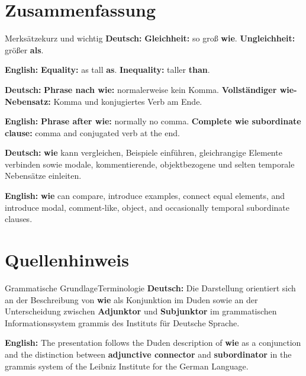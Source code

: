\documentclass[a4paper,11pt]{article}
\newcommand{\GermanText}[1]{\textbf{Deutsch: }#1\par}
\newcommand{\EnglishText}[1]{{\small\color{SoftGray}\textbf{English: }#1\par}}
\begin{document}
\section{Zusammenfassung}

\begin{grammarentry}{Merksätze}{kurz und wichtig}
\GermanText{\textbf{Gleichheit:} so groß \textbf{wie}. \textbf{Ungleichheit:} größer \textbf{als}.}
\EnglishText{\textbf{Equality:} as tall \textbf{as}. \textbf{Inequality:} taller \textbf{than}.}

\GermanText{\textbf{Phrase nach wie:} normalerweise kein Komma. \textbf{Vollständiger wie-Nebensatz:} Komma und konjugiertes Verb am Ende.}
\EnglishText{\textbf{Phrase after wie:} normally no comma. \textbf{Complete wie subordinate clause:} comma and conjugated verb at the end.}

\GermanText{\textbf{wie} kann vergleichen, Beispiele einführen, gleichrangige Elemente verbinden sowie modale, kommentierende, objektbezogene und selten temporale Nebensätze einleiten.}
\EnglishText{\textbf{wie} can compare, introduce examples, connect equal elements, and introduce modal, comment-like, object, and occasionally temporal subordinate clauses.}
\end{grammarentry}

\section{Quellenhinweis}

\begin{grammarentry}{Grammatische Grundlage}{Terminologie}
\GermanText{Die Darstellung orientiert sich an der Beschreibung von \textbf{wie} als Konjunktion im Duden sowie an der Unterscheidung zwischen \textbf{Adjunktor} und \textbf{Subjunktor} im grammatischen Informationssystem grammis des Instituts für Deutsche Sprache.}
\EnglishText{The presentation follows the Duden description of \textbf{wie} as a conjunction and the distinction between \textbf{adjunctive connector} and \textbf{subordinator} in the grammis system of the Leibniz Institute for the German Language.}
\end{grammarentry}
\end{document}
